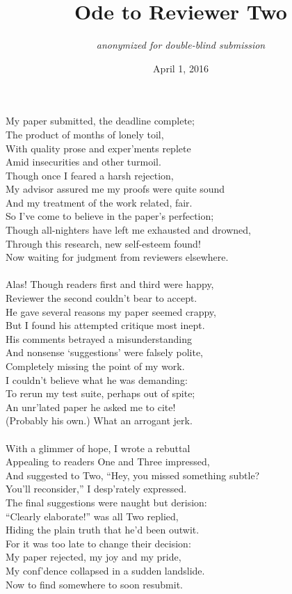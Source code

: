 \documentclass{article}
\title{Ode to Reviewer Two}
\author{{\em anonymized for double-blind submission}}
\date{April 1, 2016}
\begin{document}
\maketitle
\thispagestyle{empty}

\noindent
My paper submitted, the deadline complete;\\
The product of months of lonely toil,\\
With quality prose and exper'ments replete\\
Amid insecurities and other turmoil.\\
Though once I feared a harsh rejection,\\
My advisor assured me my proofs were quite sound\\
And my treatment of the work related, fair.\\
So I've come to believe in the paper's perfection;\\
Though all-nighters have left me exhausted and drowned,\\
Through this research, new self-esteem found!\\
Now waiting for judgment from reviewers elsewhere.\\
\\
Alas! Though readers first and third were happy,\\
Reviewer the second couldn't bear to accept.\\
He gave several reasons my paper seemed crappy,\\
But I found his attempted critique most inept.\\
His comments betrayed a misunderstanding\\
And nonsense `suggestions' were falsely polite,\\
Completely missing the point of my work.\\
I couldn't believe what he was demanding:\\
To rerun my test suite, perhaps out of spite;\\
An unr'lated paper he asked me to cite!\\
(Probably his own.) What an arrogant jerk.\\
\\
With a glimmer of hope, I wrote a rebuttal\\
Appealing to readers One and Three impressed,\\
And suggested to Two, ``Hey, you missed something subtle?\\
You'll reconsider,'' I desp'rately expressed.\\
The final suggestions were naught but derision:\\
``Clearly elaborate!'' was all Two replied,\\
Hiding the plain truth that he'd been outwit.\\
For it was too late to change their decision:\\
My paper rejected, my joy and my pride,\\
My conf'dence collapsed in a sudden landslide.\\
Now to find somewhere to soon resubmit.\\
\end{document}
